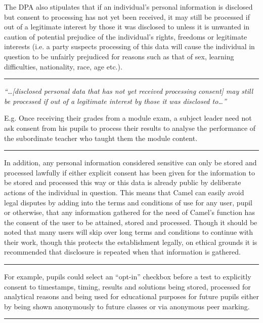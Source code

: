     The DPA also stipulates that if an individual’s personal information is disclosed but consent to processing has not yet been received, it may still be processed if out of a legitimate interest by those it was disclosed to unless it is unwanted in caution of potential prejudice of the individual’s rights, freedoms or legitimate interests\cite{DPA:tDPP:S2} (i.e. a party suspects processing of this data will cause the individual in question to be unfairly prejudiced for reasons such as that of sex, learning difficulties, nationality, race, age etc.).

    \vspace{0.2cm}
    \hrule
    \begin{center}
        \small \em “\ldots[disclosed personal data that has not yet received processing consent] may still be processed if out of a legitimate interest by those it was disclosed to…”
    \end{center}

    \begin{flushright}
        \scriptsize E.g. Once receiving their grades from a module exam, a subject leader need not ask consent from his pupils to process their results to analyse the performance of the subordinate teacher who taught them the module content.
    \end{flushright}
    \hrule
    \vspace{0.2cm}

    In addition, any personal information considered sensitive can only be stored and processed lawfully if either explicit consent has been given for the information to be stored and processed this way or this data is already public by deliberate actions of the individual in question.\cite{DPA:tDPP:S3} This means that Camel can easily avoid legal disputes by adding into the terms and conditions of use for any user, pupil or otherwise, that any information gathered for the need of Camel’s function has the consent of the user to be attained, stored and processed. Though it should be noted that many users will skip over long terms and conditions to continue with their work, though this protects the establishment legally, on ethical grounds it is recommended that disclosure is repeated when that information is gathered.

    \vspace{0.2cm}
    \hrule
    \begin{flushright}
        \scriptsize For example, pupils could select an “opt-in” checkbox before a test to explicitly consent to timestamps, timing, results and solutions being stored, processed for analytical reasons and being used for educational purposes for future pupils either by being shown anonymously  to future classes or via anonymous peer marking.
    \end{flushright}
    \hrule
    \vspace{0.2cm}

